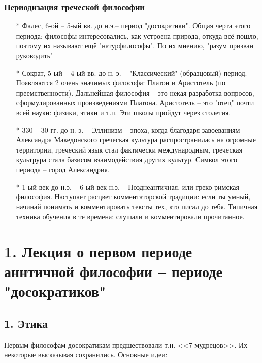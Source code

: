 \documentclass[a4paper, 12pt]{book} %
\begin{document}
\subsubsection*{Периодизация греческой философии}
\begin{itemize}
\item[*] Фалес, 6-ой -- 5-ый вв. до н.э.-- период "досократики". Общая черта этого периода: философы интересовались, как устроена природа, откуда всё пошло, поэтому их называют ещё "натурфилософы". По их мнению, "разум призван руководить"

\item[*] Сократ, 5-ый -- 4-ый вв. до н. э.  -- "Классический" (образцовый) период. Появляются 2 очень значимых философа: Платон и Аристотель (по преемственности). Дальнейшая философия -- это некая разработка вопросов, сформулированных произведениями Платона. Аристотель -- это "отец" почти всей науки: физики, этики и т.п. Эти школы пройдут через столетия.

\item[*] 330 -- 30 гг. до н. э. -- Эллинизм -- эпоха, когда благодаря завоеваниям Александра Македонского греческая культура распространилась на огромные территории, греческий язык стал фактически международным, греческая культрура стала базисом взаимодействия других культур. Символ этого периода -- город Александрия.

\item[*] 1-ый век до н.э. -- 6-ый век н.э. -- Позднеантичная, или греко-римская философия. Наступает расцвет комментаторской традиции: если ты умный, начинай понимать и комментировать тексты тех, кто писал до тебя. Типичная техника обучения в те времена: слушали и комментировали прочитанное. 
\end{itemize}

 
\section*{1. Лекция о первом периоде аннтичной философии -- периоде "досократиков"}

\subsection*{1. Этика}
Первым философам-досократикам предшествовали т.н. <<7 мудрецов>>. Их некоторые высказывая сохранились. Основные идеи:
\end{document}
